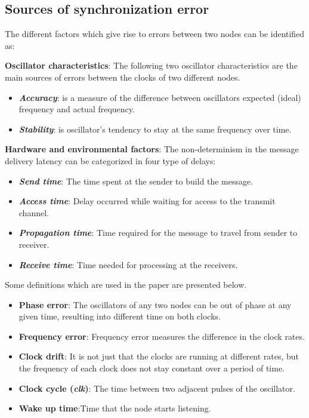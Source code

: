\documentclass[journal]{IEEEtran}
\begin{document}
\subsection{\textbf{Sources of synchronization error}}
The different factors which give rise to errors between two nodes can be identified as:\par \noindent
\textbf{Oscillator characteristics}: The following two oscillator characteristics are the main sources of errors between the clocks of two different nodes.
         \begin{itemize}
         \item \emph{\textbf{Accuracy}}: is a measure of the difference between oscillators expected (ideal)
           frequency and actual frequency.
         \item \emph{\textbf{Stability}}: is oscillator's tendency to stay at the same frequency over
           time.
      \end{itemize}
\textbf{Hardware and environmental factors}: The non-determinism in the message delivery latency can be categorized in four type of delays:
      \begin{itemize}
         \item \emph{\textbf{Send time}}: The time spent at the sender to build the message.
         \item \emph{\textbf{Access time}}: Delay occurred while waiting for access to the transmit channel.
         \item \emph{\textbf{Propagation time}}: Time required for the message to travel from sender to receiver.
         \item \emph{\textbf{Receive time}}: Time needed for processing at the receivers.
      \end{itemize}
Some definitions which are used in the paper are presented below.
\begin{itemize}
\item \textbf{Phase error}: The oscillators of any two nodes can be out of phase at any given time, resulting into different time on both clocks.
\item \textbf{Frequency error}: Frequency error measures the difference in the clock rates.
\item \textbf{Clock drift}: It is not just that the clocks are running at different rates, but the frequency of each clock does not stay constant over a period of time.
\item \textbf{Clock cycle (\textit{clk})}: The time between two adjacent pulses of the oscillator.
\item \textbf{Wake up time}:Time that the node starts listening.
\end{itemize}
\end{document}
